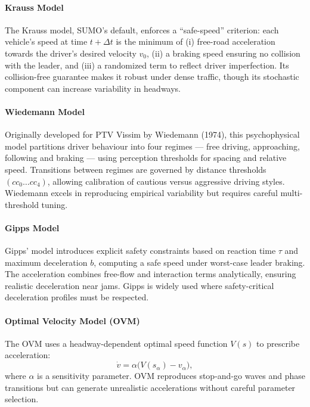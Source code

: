 \paragraph{Krauss Model}  
The Krauss model, SUMO’s default, enforces a “safe-speed” criterion: each vehicle’s speed at time \(t+\Delta t\) is the minimum of (i) free-road acceleration towards the driver’s desired velocity \(v_0\), (ii) a braking speed ensuring no collision with the leader, and (iii) a randomized term to reflect driver imperfection. Its collision-free guarantee makes it robust under dense traffic, though its stochastic component can increase variability in headways. \cite{Krauss1997}

\paragraph{Wiedemann Model}  
Originally developed for PTV Vissim by Wiedemann (1974), this psychophysical model partitions driver behaviour into four regimes --- free driving, approaching, following and braking --- using perception thresholds for spacing and relative speed. Transitions between regimes are governed by distance thresholds \((cc_0\ldots cc_4)\), allowing calibration of cautious versus aggressive driving styles. Wiedemann excels in reproducing empirical variability but requires careful multi-threshold tuning. \cite{Wiedemann1974}

\paragraph{Gipps Model}  
Gipps’ model introduces explicit safety constraints based on reaction time \(\tau\) and maximum deceleration \(b\), computing a safe speed under worst-case leader braking. The acceleration combines free-flow and interaction terms analytically, ensuring realistic deceleration near jams. Gipps is widely used where safety-critical deceleration profiles must be respected. \cite{Gipps1981}

\paragraph{Optimal Velocity Model (OVM)}  
The OVM uses a headway-dependent optimal speed function \(V(s)\) to prescribe acceleration:  
\[
\dot v = \alpha \bigl(V(s_\alpha) - v_\alpha\bigr),
\]
where \(\alpha\) is a sensitivity parameter. OVM reproduces stop-and-go waves and phase transitions but can generate unrealistic accelerations without careful parameter selection. \cite{Bando1995}

